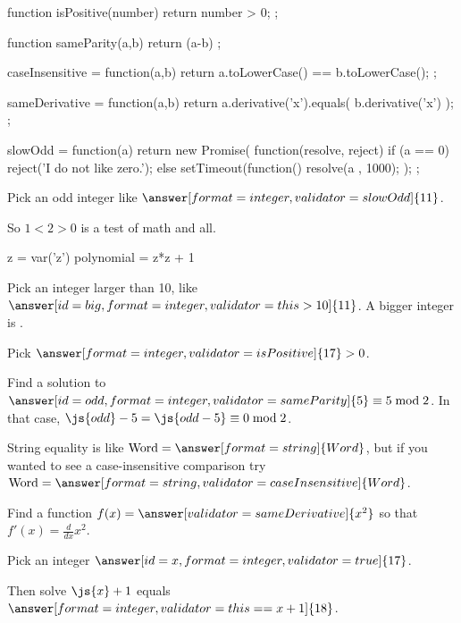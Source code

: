\documentclass{ximera}
\begin{document}
\begin{javascript}
  function isPositive(number) {
    return number > 0;
  };

  function sameParity(a,b) {
    return (a-b)%
  };

  caseInsensitive = function(a,b) {
    return a.toLowerCase() == b.toLowerCase();
  };

  sameDerivative = function(a,b) {
    return a.derivative('x').equals( b.derivative('x') );
  };

  slowOdd = function(a) {
    return new Promise( function(resolve, reject) {
      if (a == 0)
        reject('I do not like zero.');
      else
        setTimeout(function(){
          resolve(a %
        }, 1000);      
    });
  };  
\end{javascript}


\begin{problem}
  Pick an odd integer like $\answer[format=integer,validator=slowOdd]{11}$.
\end{problem}

So $1 < 2 > 0$ is a test of math and all.

\begin{sageCell}
z = var('z')
polynomial = z*z + 1
\end{sageCell}

\begin{problem}
  Pick an integer larger than 10, like $\answer[id=big,format=integer,validator=this>10]{11}$.  A bigger integer is .

  Pick $\answer[format=integer,validator=isPositive]{17} > 0$.

  Find a solution to $\answer[id=odd,format=integer,validator=sameParity]{5} \equiv 5 \bmod 2$.  In that case, $\js{odd} - 5 = \js{odd-5} \equiv 0 \bmod 2$.

  String equality is like $\mbox{Word} = \answer[format=string]{Word}$, but if you wanted to see a case-insensitive comparison try $\mbox{Word} = \answer[format=string,validator=caseInsensitive]{Word}$.

  Find a function $f(x) = \answer[validator=sameDerivative]{x^2}$ so that $f'(x) = \frac{d}{dx} x^2$.
\end{problem}

\begin{problem}
  Pick an integer $\answer[id=x,format=integer,validator=true]{17}$.

  Then solve $\js{x} + 1$ equals $\answer[format=integer,validator=this==x+1]{18}$.
\end{problem}
\end{document}
